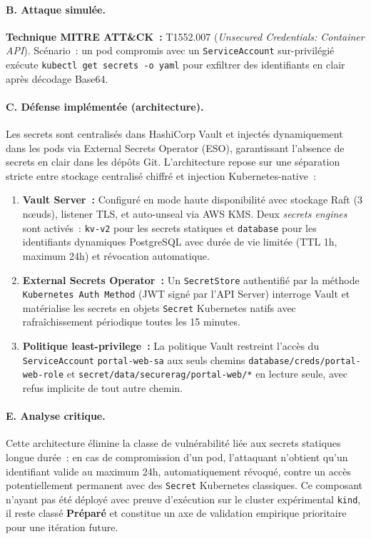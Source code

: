 \paragraph{B. Attaque simulée.}
\textbf{Technique MITRE ATT\&CK~:} T1552.007 (\textit{Unsecured Credentials: Container API}). Scénario~: un pod compromis avec un \texttt{ServiceAccount} sur-privilégié exécute \texttt{kubectl get secrets -o yaml} pour exfiltrer des identifiants en clair après décodage Base64.

\paragraph{C. Défense implémentée (architecture).}
Les secrets sont centralisés dans HashiCorp Vault et injectés dynamiquement dans les pods via External Secrets Operator (ESO), garantissant l'absence de secrets en clair dans les dépôts Git. L'architecture repose sur une séparation stricte entre stockage centralisé chiffré et injection Kubernetes-native~:

\begin{enumerate}
    \item \textbf{Vault Server~:} Configuré en mode haute disponibilité avec stockage Raft (3 nœuds), listener TLS, et auto-unseal via AWS KMS. Deux \textit{secrets engines} sont activés~: \texttt{kv-v2} pour les secrets statiques et \texttt{database} pour les identifiants dynamiques PostgreSQL avec durée de vie limitée (TTL 1h, maximum 24h) et révocation automatique.
    \item \textbf{External Secrets Operator~:} Un \texttt{SecretStore} authentifié par la méthode \texttt{Kubernetes Auth Method} (JWT signé par l'API Server) interroge Vault et matérialise les secrets en objets \texttt{Secret} Kubernetes natifs avec rafraîchissement périodique toutes les 15 minutes.
    \item \textbf{Politique least-privilege~:} La politique Vault restreint l'accès du \texttt{ServiceAccount} \texttt{portal-web-sa} aux seuls chemins \texttt{database/creds/portal-web-role} et \texttt{secret/data/securerag/portal-web/*} en lecture seule, avec refus implicite de tout autre chemin.
\end{enumerate}

\paragraph{E. Analyse critique.}
Cette architecture élimine la classe de vulnérabilité liée aux secrets statiques longue durée~: en cas de compromission d'un pod, l'attaquant n'obtient qu'un identifiant valide au maximum 24h, automatiquement révoqué, contre un accès potentiellement permanent avec des \texttt{Secret} Kubernetes classiques. Ce composant n'ayant pas été déployé avec preuve d'exécution sur le cluster expérimental \texttt{kind}, il reste classé \textbf{Préparé} et constitue un axe de validation empirique prioritaire pour une itération future.

